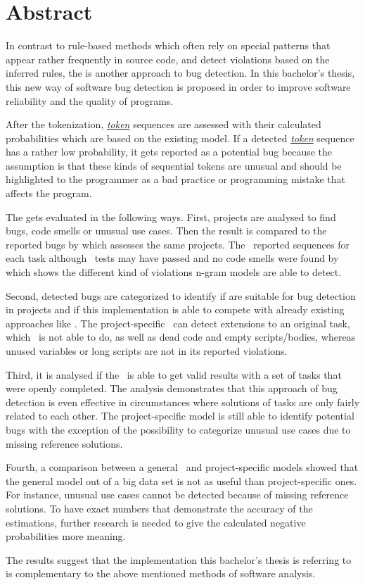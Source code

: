 \chapter*{Abstract}

In contrast to rule-based methods which often rely on special patterns that appear rather frequently in source code, and detect violations based on the inferred rules, the \ngram{} is another approach to bug detection. In this bachelor's thesis, this new way of software bug detection is proposed in order to improve software reliability and the quality of \scratch{} programs.

After the tokenization, \hyperref[def:token]{\textit{token}} sequences are assessed with their calculated probabilities which are based on the existing model. If a detected \hyperref[def:token]{\textit{token}} sequence has a rather low probability, it gets reported as a potential bug because the assumption is that these kinds of sequential tokens are unusual and should be highlighted to the programmer as a bad practice or programming mistake that affects the program.

The \ngram{} gets evaluated in the following ways. First, \scratch{} projects are analysed to find bugs, code smells or unusual use cases. Then the result is compared to the reported bugs by \litterbox{} which assesses the same projects. The \ngram\ reported sequences for each task although \whisker\ tests may have passed and no code smells were found by \litterbox{} which shows the different kind of violations n-gram models are able to detect.

Second, detected bugs are categorized to identify if  are suitable for bug detection in \scratch{} projects and if this implementation is able to compete with already existing approaches like \litterbox{}. The project-specific \ngram\ can detect extensions to an original task, which \litterbox\ is not able to do, as well as dead code and empty scripts/bodies, whereas unused variables or long scripts are not in its reported violations.  

Third, it is analysed if the \ngram\ is able to get valid results with a set of tasks that were openly completed. The analysis demonstrates that this approach of bug detection is even effective in circumstances where solutions of tasks are only fairly related to each other. The project-specific model is still able to identify potential bugs with the exception of the possibility to categorize unusual use cases due to missing reference solutions.

Fourth, a comparison between a general \ngram\ and project-specific models showed that the general model out of a big data set is not as useful than project-specific ones. For instance, unusual use cases cannot be detected because of missing reference solutions. To have exact numbers that demonstrate the accuracy of the estimations, further research is needed to give the calculated negative probabilities more meaning. 

The results suggest that the implementation this bachelor's thesis is referring to is complementary to the above mentioned methods of software analysis.

